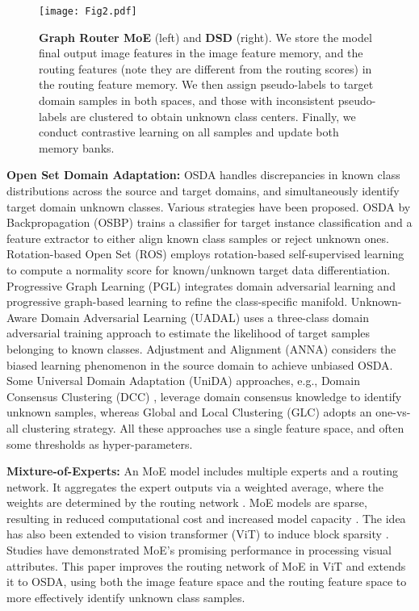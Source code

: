 \documentclass[10pt,twocolumn,letterpaper]{article}
\begin{document}
\begin{figure*}[htpb]     \centering
    \texttt{[image: Fig2.pdf]}
    \caption{\textbf{Graph Router MoE} (left) and \textbf{DSD} (right). We store the model final output image features in the image feature memory, and the routing features (note they are different from the routing scores) in the routing feature memory. We then assign pseudo-labels to target domain samples in both spaces, and those with inconsistent pseudo-labels are clustered to obtain unknown class centers. Finally, we conduct contrastive learning on all samples and update both memory banks.}     \label{Fig2}     \vspace{-0.18in}
    \end{figure*}

\textbf{Open Set Domain Adaptation:} OSDA handles discrepancies in known class distributions across the source and target domains, and simultaneously identify target domain unknown classes. Various strategies have been proposed. OSDA by
Backpropagation (OSBP) \cite{saito2018open} trains a classifier for target instance classification and a feature extractor to either align known class samples or reject unknown ones. Rotation-based Open Set (ROS) \cite{bucci2020effectiveness} employs rotation-based self-supervised learning to compute a normality score for known/unknown target data differentiation. Progressive Graph Learning (PGL) \cite{luo2020progressive} integrates domain adversarial learning and progressive graph-based learning to refine the class-specific manifold. Unknown-Aware Domain Adversarial Learning (UADAL) \cite{jang2022unknown} uses a three-class domain adversarial training approach to estimate the likelihood of target samples belonging to known classes. Adjustment and Alignment (ANNA) \cite{li2023adjustment} considers the biased learning phenomenon in the source domain to achieve unbiased OSDA. Some Universal Domain Adaptation (UniDA) approaches, e.g., Domain Consensus Clustering (DCC) \cite{li2021domain}, leverage domain consensus knowledge to identify unknown samples, whereas Global and Local Clustering (GLC) \cite{sanqing2023GLC} adopts an one-vs-all clustering strategy. All these approaches use a single feature space, and often some thresholds as hyper-parameters.

\textbf{Mixture-of-Experts:} An MoE model \cite{jacobs1991adaptive} includes multiple experts and a routing network. It aggregates the expert outputs via a weighted average, where the weights are determined by the routing network \cite{fedus2022review}. MoE models are sparse, resulting in reduced computational cost and increased model capacity \cite{shazeer2017outrageously}. The idea has also been extended to vision transformer (ViT) to induce block sparsity \cite{riquelme2021scaling}. Studies \cite{mustafa2022multimodal, li2023sparse} have demonstrated MoE's promising performance in processing visual attributes. This paper improves the routing network of MoE in ViT and extends it to OSDA, using both the image feature space and the routing feature space to more effectively identify unknown class samples.
\end{document}
